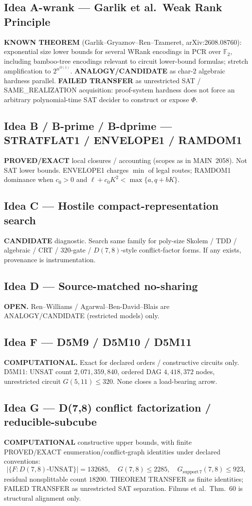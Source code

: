 \documentclass[11pt]{article}
\begin{document}
\subsection*{Idea A-wrank --- Garlik et al.\ Weak Rank Principle}
\textbf{KNOWN THEOREM} (Garlik--Gryaznov--Ren--Tzameret, arXiv:2608.08760):
exponential size lower bounds for several WRank encodings in PCR over
$\mathbb F_2$, including bamboo-tree encodings relevant to circuit lower-bound
formulas; stretch amplification to $2^{n^{\Omega(1)}}$.
\textbf{ANALOGY/CANDIDATE} as char-$2$ algebraic hardness parallel.
\textbf{FAILED TRANSFER} as unrestricted SAT / SAME\_REALIZATION acquisition:
proof-system hardness does not force an arbitrary polynomial-time SAT decider to
construct or expose $\Phi$.

\subsection*{Idea B / B-prime / B-dprime --- STRATFLAT1 / ENVELOPE1 / RAMDOM1}
\textbf{PROVED/EXACT} local closures / accounting (scopes as in MAIN~2058).
Not SAT lower bounds. ENVELOPE1 charges $\min$ of legal routes; RAMDOM1 dominance
when $c_0\gt 0$ and $\ell+c_0K^2\lt\max\{a,q+bK\}$.

\subsection*{Idea C --- Hostile compact-representation search}
\textbf{CANDIDATE} diagnostic. Search same family for poly-size Skolem / TDD /
algebraic / CRT / $320$-gate / $D(7,8)$-style conflict-factor forms. If any exists,
provenance is instrumentation.

\subsection*{Idea D --- Source-matched no-sharing}
\textbf{OPEN.} Ren--Williams / Agarwal--Ben-David--Blais are ANALOGY/CANDIDATE
(restricted models) only.

\subsection*{Idea F --- D5M9 / D5M10 / D5M11}
\textbf{COMPUTATIONAL.} Exact for declared orders / constructive circuits only.
D5M11: UNSAT count $2{,}071{,}359{,}840$, ordered DAG $4{,}418{,}372$ nodes,
unrestricted circuit $G(5,11)\le 320$. None closes a load-bearing arrow.

\subsection*{Idea G --- D(7,8) conflict factorization / reducible-subcube}
\textbf{COMPUTATIONAL} constructive upper bounds, with finite PROVED/EXACT
enumeration/conflict-graph identities under declared conventions:
\[
|\{F:D(7,8)\text{-UNSAT}\}|=132685,\quad
G(7,8)\le 2285,\quad
G_{\mathrm{support}\,7}(7,8)\le 923,
\]
residual nonsplittable count $18200$. THEOREM TRANSFER as finite identities;
FAILED TRANSFER as unrestricted SAT separation. Filmus et al.\ Thm.~60 is
structural alignment only.
\end{document}
